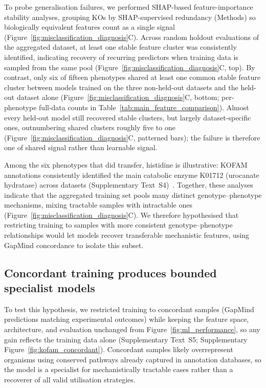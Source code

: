 To probe generalisation failures, we performed SHAP-based feature-importance stability analyses, grouping KOs by SHAP-supervised redundancy (Methods) so biologically equivalent features count as a single signal (Figure~\ref{fig:misclassification_diagnosis}C).
Across random holdout evaluations of the aggregated dataset, at least one stable feature cluster was consistently identified, indicating recovery of recurring predictors when training data is sampled from the same pool (Figure~\ref{fig:misclassification_diagnosis}C, top).
By contrast, only six of fifteen phenotypes shared at least one common stable feature cluster between models trained on the three non-held-out datasets and the held-out dataset alone (Figure~\ref{fig:misclassification_diagnosis}C, bottom; per-phenotype full-data counts in Table~\ref{tab:main_feature_comparison}).
Almost every held-out model still recovered stable clusters, but largely dataset-specific ones, outnumbering shared clusters roughly five to one (Figure~\ref{fig:misclassification_diagnosis}C, patterned bars); the failure is therefore one of shared signal rather than learnable signal.

Among the six phenotypes that did transfer, histidine is illustrative: KOFAM annotations consistently identified the main catabolic enzyme K01712 (urocanate hydratase) across datasets (Supplementary Text~S4)~\cite{Bender2012HutBacteria}.
Together, these analyses indicate that the aggregated training set pools many distinct genotype--phenotype mechanisms, mixing tractable samples with intractable ones (Figure~\ref{fig:misclassification_diagnosis}C).
We therefore hypothesised that restricting training to samples with more consistent genotype--phenotype relationships would let models recover transferable mechanistic features, using GapMind concordance to isolate this subset.
\FloatBarrier{}

\subsection*{Concordant training produces bounded specialist models}

To test this hypothesis, we restricted training to concordant samples (GapMind predictions matching experimental outcomes) while keeping the feature space, architecture, and evaluation unchanged from Figure~\ref{fig:ml_performance}, so any gain reflects the training data alone (Supplementary Text~S5; Supplementary Figure~\ref{fig:kofam_concordant}).
Concordant samples likely overrepresent organisms using conserved pathways already captured in annotation databases, so the model is a specialist for mechanistically tractable cases rather than a recoverer of all valid utilisation strategies.

